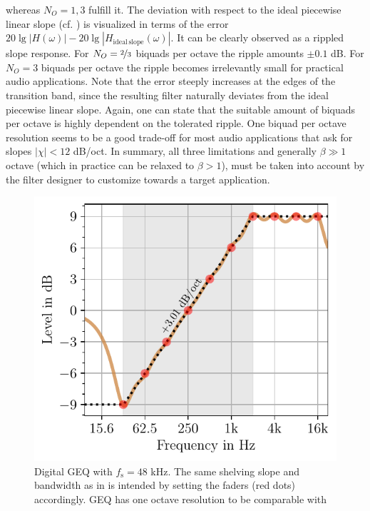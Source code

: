 whereas $N_O=1,3$ fulfill it.
%
The deviation with respect
to the ideal piecewise linear slope (cf. )
is visualized in terms of the error
$20\lg|H(\omega)|-20\lg|H_\mathrm{ideal\,slope}(\omega)|$.
%
It can be clearly observed as a rippled slope response.
%
For $N_O = \nicefrac{2}{3}$ biquads per octave the ripple amounts $\pm 0.1$ dB.
%
For $N_O=3$ biquads per octave the ripple becomes irrelevantly small for
practical audio applications.
%
Note that the error steeply increases at the edges of the transition band,
since the resulting filter naturally deviates from the ideal piecewise linear
slope.
%
Again, one can state that the suitable amount of biquads per octave is highly
dependent on the tolerated ripple.
%
One biquad per octave resolution seems to be a good trade-off for most
audio applications that ask for slopes $|\chi|<12$ dB/oct.
%
%
\NewL In summary, all three limitations and generally $\beta\gg 1$ octave (which in
practice can be relaxed to $\beta>1$),
must be taken into account by the filter designer to customize towards a target
application.

%

\begin{figure}[h!]
\centering
\includegraphics[width=0.68\columnwidth]{../graphics/liski2019-geq-3db-per-oct.pdf}
\caption{Digital GEQ \cite{Liski2019} with $f_\mathrm{s}=48$ kHz. The same shelving slope and bandwidth as in
 is intended by setting the
faders (red dots) accordingly.
GEQ has one octave resolution to be comparable with
}
\label{fig:liski2019-geq-3db-per-oct}
\end{figure}








